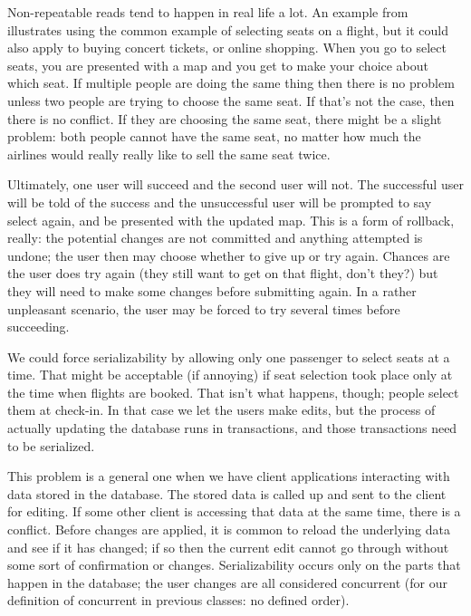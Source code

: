Non-repeatable reads tend to happen in real life a lot. An example from~\cite{dsc} illustrates using the common example of selecting seats on a flight, but it could also apply to buying concert tickets, or online shopping. When you go to select seats, you are presented with a map and you get to make your choice about which seat. If multiple people are doing the same thing then there is no problem unless two people are trying to choose the same seat. If that's not the case, then there is no conflict. If they are choosing the same seat, there might be a slight problem: both people cannot have the same seat, no matter how much the airlines would really really like to sell the same seat twice.

Ultimately, one user will succeed and the second user will not. The successful user will be told of the success and the unsuccessful user will be prompted to say select again, and be presented with the updated map. This is a form of rollback, really: the potential changes are not committed and anything attempted is undone; the user then may choose whether to give up or try again. Chances are the user does try again (they still want to get on that flight, don't they?) but they will need to make some changes before submitting again. In a rather unpleasant scenario, the user may be forced to try several times before succeeding.

We could force serializability by allowing only one passenger to select seats at a time. That might be acceptable (if annoying) if seat selection took place only at the time when flights are booked. That isn't what happens, though; people select them at check-in. In that case we let the users make edits, but the process of actually updating the database runs in transactions, and those transactions need to be serialized. 

This problem is a general one when we have client applications interacting with data stored in the database. The stored data is called up and sent to the client for editing. If some other client is accessing that data at the same time, there is a conflict. Before changes are applied, it is common to reload the underlying data and see if it has changed; if so then the current edit cannot go through without some sort of confirmation or changes. Serializability occurs only on the parts that happen in the database; the user changes are all considered concurrent (for our definition of concurrent in previous classes: no defined order).





